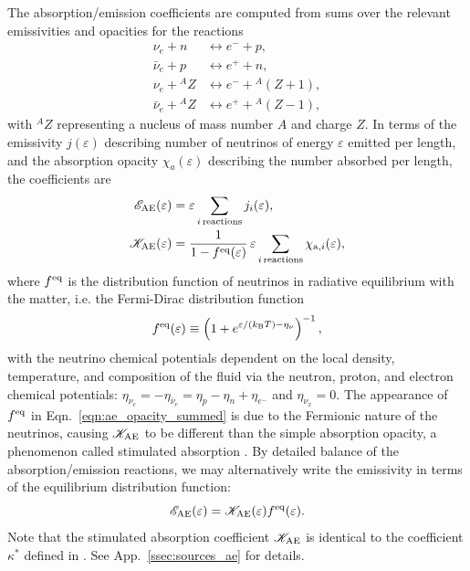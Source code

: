 \documentclass[aps,floatfix,prd,superscriptaddress,twocolumn]{revtex4-1}
\begin{document}
The absorption/emission coefficients are computed from sums
over the relevant emissivities and opacities
for the reactions
\begin{align}
  \nu_e + n            &\leftrightarrow e^- + p,\nonumber\\
  \bar{\nu}_e + p      &\leftrightarrow e^+ + n,\nonumber\\
  \nu_e + {}^AZ        &\leftrightarrow e^- + {}^A(Z+1),\nonumber\\
  \bar{\nu}_e + {}^AZ  &\leftrightarrow e^+ + {}^A(Z-1),\nonumber
\end{align}
with ${}^AZ$ representing a nucleus of mass number $A$ and charge $Z$.
In terms of the emissivity $j(\varepsilon)$ describing number of neutrinos
of energy $\varepsilon$ emitted per length,
and the absorption opacity $\chi_a(\varepsilon)$
describing the number absorbed per length,
the coefficients are
\begin{align}
  \label{eqn:ae_emissivity_summed}
  \mathscr{E}_{\rm AE}(\varepsilon)
  &= \varepsilon \sum_{i\,{\rm reactions}} j_i(\varepsilon), \\
  \label{eqn:ae_opacity_summed}
  \mathscr{K}_{\rm AE}(\varepsilon)
  &= \frac{1}{1-f^{\rm eq}(\varepsilon)} \,
  \varepsilon \sum_{i\,{\rm reactions}} \chi_{{\rm a},i}(\varepsilon),
\end{align}
where $f^{\rm eq}$ is the distribution function of neutrinos in radiative
equilibrium with the matter, i.e. the Fermi-Dirac distribution function
\begin{equation}
  \label{eqn:feq}
  f^{\rm eq}(\varepsilon) \equiv
  \left(1+e^{\varepsilon/(k_{\rm B} T) -\eta_\nu}\right)^{-1},
\end{equation}
with the neutrino chemical potentials dependent on the local density,
temperature, and composition of the fluid via the neutron, proton,
and electron chemical potentials:
$\eta_{\nu_e}=-\eta_{\bar{\nu}_e}=\eta_p-\eta_n+\eta_{e^-}$ and
$\eta_{\nu_x}=0$.
The appearance of $f^{\rm eq}$ in Eqn.~\ref{eqn:ae_opacity_summed} is due to
the Fermionic nature of the neutrinos, causing $\mathscr{K}_{\rm AE}$ to be
different than the simple absorption opacity,
a phenomenon called stimulated absorption \cite{burr2006-neutrino_opacities}.
By detailed balance of the absorption/emission reactions, we may alternatively
write the emissivity in terms of the equilibrium distribution function:
\begin{equation}
  \label{eqn:ae_emissivity_feq}
  \mathscr{E}_{\rm AE}(\varepsilon)
  = \mathscr{K}_{\rm AE}(\varepsilon) f^{\rm eq}(\varepsilon).
\end{equation}
Note that the stimulated absorption coefficient $\mathscr{K}_{\rm AE}$ is
identical to the coefficient $\kappa^*$
defined in \cite{hari2010-gr_nunubar_collapsar}.
See App.~\ref{ssec:sources_ae} for details.
\end{document}

